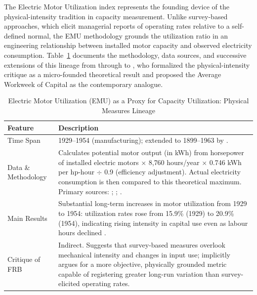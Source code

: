 \documentclass[11pt,a4paper]{article}
\begin{document}
The Electric Motor Utilization index represents the founding device of the
physical-intensity tradition in capacity measurement. Unlike survey-based
approaches, which elicit managerial reports of operating rates relative to a
self-defined normal, the EMU methodology grounds the utilization ratio in an
engineering relationship between installed motor capacity and observed
electricity consumption. Table~\ref{tab:EMU_proxy_CU} documents the
methodology, data sources, and successive extensions of this lineage from
\citet{Foss1963} through \citet{Shaikh1992,Shaikh2016} to
\citet{Nikiforos2016}, who formalized the physical-intensity critique as a
micro-founded theoretical result and proposed the Average Workweek of Capital
as the contemporary analogue.

\begin{table}[!h]
	\centering
	\caption{Electric Motor Utilization (EMU) as a Proxy for Capacity
		Utilization: Physical Measures Lineage}
	\label{tab:EMU_proxy_CU}
	\small
	\begin{tabular}{p{3.2cm} p{10.5cm}}
		\toprule
		Feature & Description \\
		\midrule
		
		Time Span &
		1929--1954 (manufacturing); extended to 1899--1963 by
		\citet{Shaikh1992}. \\[4pt]
		
		Data \& Methodology &
		Calculates potential motor output (in kWh) from horsepower of
		installed electric motors $\times$ 8{,}760 hours/year $\times$
		0.746 kWh per hp-hour $\div$ 0.9 (efficiency adjustment). Actual
		electricity consumption is then compared to this theoretical
		maximum. Primary sources: \citet{USfpc1945};
		\citet{UScensus1966,UScensus1967,UScensus1975};
		\citet{USdc1986}. \\[4pt]
		
		Main Results &
		Substantial long-term increases in motor utilization from 1929 to
		1954: utilization rates rose from 15.9\% (1929) to 20.9\% (1954),
		indicating rising intensity in capital use even as labour hours
		declined \citep{Foss1963}. \\[4pt]
		
		Critique of FRB &
		Indirect. Suggests that survey-based measures overlook mechanical
		intensity and changes in input use; implicitly argues for a more
		objective, physically grounded metric capable of registering
		greater long-run variation than survey-elicited operating rates. \\[4pt]
		

\end{tabular}
\end{table}
\end{document}
